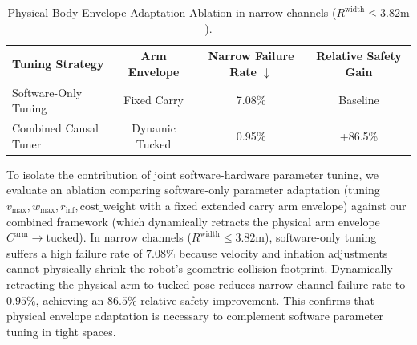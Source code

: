 
\begin{table}[t]
\centering
\caption{Physical Body Envelope Adaptation Ablation in narrow channels ($R^{\text{width}} \le 3.82\text{m}$).}
\label{tab:envelope_ablation}
\footnotesize
\begin{tabularx}{\columnwidth}{@{}X c c c@{}}
\toprule
\textbf{Tuning Strategy} & \textbf{Arm Envelope} & \textbf{Narrow Failure Rate $\downarrow$} & \textbf{Relative Safety Gain} \\
\midrule
Software-Only Tuning & Fixed Carry & 7.08\% & Baseline \\
Combined Causal Tuner & Dynamic Tucked & 0.95\% & +86.5\% \\
\bottomrule
\end{tabularx}
\end{table}

To isolate the contribution of joint software-hardware parameter tuning, we evaluate an ablation comparing software-only parameter adaptation (tuning $v_{\max}, w_{\max}, r_{\inf}, \text{cost\_weight}$ with a fixed extended carry arm envelope) against our combined framework (which dynamically retracts the physical arm envelope $C^{\text{arm}} \to \text{tucked}$). In narrow channels ($R^{\text{width}} \le 3.82\text{m}$), software-only tuning suffers a high failure rate of $7.08\%$ because velocity and inflation adjustments cannot physically shrink the robot's geometric collision footprint. Dynamically retracting the physical arm to tucked pose reduces narrow channel failure rate to $0.95\%$, achieving an $86.5\%$ relative safety improvement. This confirms that physical envelope adaptation is necessary to complement software parameter tuning in tight spaces.
